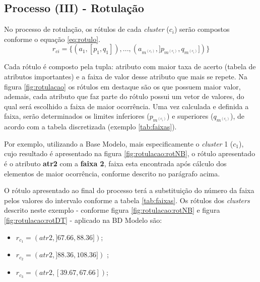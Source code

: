 \subsection{Processo (III) - Rotulação} \label{cap:ferramentas:ssec:rotulacao}

No processo de rotulação, os rótulos de cada \textit{cluster} (${c_i}$) serão compostos conforme o  equação \ref{eq:rotulo}. 
\begin{equation}\label{eq:rotulo}
r_{ci}=\{ (a_1,[p_1,q_1]),...,(a_{m^{(c_i)}}, ]p_{m^{(c_i)}},q_{m^{(c_i)}}]) \} 
\end{equation}

 Cada rótulo é composto pela tupla: atributo com maior taxa de acerto (tabela de atributos importantes) e a faixa de valor desse atributo que mais se repete. Na figura \ref{fig:rotulacao} os rótulos em destaque são os que possuem maior valor, ademais, cada atributo que faz parte do rótulo possui um vetor de valores, do qual será escolhido a faixa de maior ocorrência. Uma vez calculada e definida a faixa, serão determinados os limites inferiores (${p_{m^{(c_i)}}}$) e superiores (${q_{m^{(c_i)}}}$), de acordo com a tabela discretizada (exemplo \ref{tab:faixas}).

Por exemplo, utilizando a Base Modelo, mais especificamente o \textit{cluster} 1 ($c_1$), cujo resultado é apresentado na figura \ref{fig:rotulacao:rotNB}, o rótulo apresentado é o atributo \textbf{atr2} com a \textbf{faixa 2}, faixa esta encontrada após cálculo dos elementos de maior ocorrência, conforme descrito no parágrafo acima. 

O rótulo apresentado ao final do processo terá a substituição do número da faixa pelos valores do intervalo conforme a tabela \ref{tab:faixas}. Os rótulos dos \textit{clusters} descrito neste exemplo - conforme figura \ref{fig:rotulacao:rotNB} e figura \ref{fig:rotulacao:rotDT} - aplicado na BD Modelo são: 

\begin{itemize}[noitemsep]
            \item ${r_{c_1}=(atr2,]67.66, 88.36])}$;
            \item ${r_{c_2}=(atr2,]88.36, 108.36])}$ ;
            \item ${r_{c_3}=(atr2,[39.67, 67.66])}$;
            
\end{itemize}



